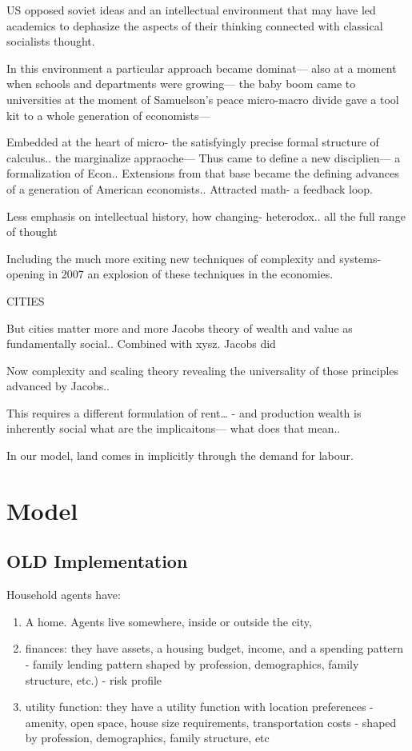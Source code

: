 US opposed soviet ideas and an intellectual environment that may have led academics to dephasize the aspects of their thinking connected with classical socialists thought. 

In this environment a particular approach became dominat— also at a moment when schools and departments were growing— the baby boom came to universities at the moment of Samuelson’s peace micro-macro divide gave a tool kit to a whole generation of economists— 

Embedded at the heart of micro- the satisfyingly precise formal structure of calculus.. the marginalize appraoche— 
Thus came to define a new disciplien— a formalization of Econ.. 
Extensions from that base became the defining advances of a generation of American economists..
Attracted math- a feedback loop.

Less emphasis on intellectual history, how changing- heterodox.. all the full range of thought

Including the much more exiting new techniques of complexity and systems- opening in 2007 an explosion of these techniques in the economies. 


CITIES

But cities matter more and more
Jacobs theory of wealth and value as fundamentally social.. 
Combined with xysz. Jacobs did

Now complexity and scaling theory revealing the universality of those principles advanced by Jacobs..

This requires a different formulation of rent… - and production wealth is inherently social what are the implicaitons— what does that mean.. 



In our model, land comes in implicitly through the demand for labour. 



\chapter{Model}



\section{OLD Implementation}


Household agents have:
\begin{enumerate}
   \item A home. Agents live somewhere, inside or outside the city,
   \item finances: they have assets, a housing budget, income, and a spending pattern - family lending pattern  
   shaped by profession, demographics, family structure, etc.) - risk profile
   \item utility function: they have a utility function with location  preferences - amenity, open space, house size requirements, transportation costs - shaped by profession, demographics, family structure, etc
\end{enumerate}	

